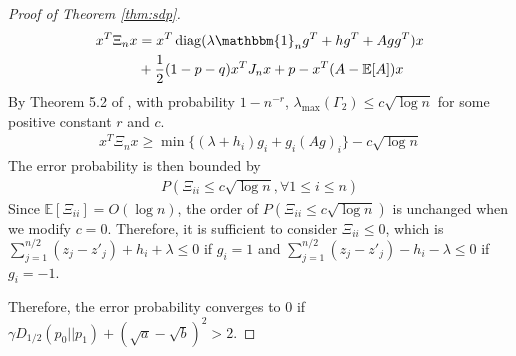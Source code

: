 \documentclass[conference]{IEEEtran}
\DeclareMathOperator{\diag}{diag}
\begin{document}
\begin{proof}[Proof of Theorem \ref{thm:sdp}]
\begin{align*}
		x^T \Xi_n x &= x^T \diag( \lambda \mathbbm{1}_ng^T+hg^T + Agg^T) x  \\
		&+ \frac{1}{2}(1-p-q)x^TJ_n x
		 + p -x^T(A-\mathbb{E}[A])x
		\end{align*}
		By Theorem 5.2 of \cite{lei2015consistency},
		with probability $1-n^{-r}$, $\lambda_{\max}(\Gamma_2) \leq c\sqrt{\log n}$ for some positive constant $r$ and $c$.
		\begin{align*}
		x^T \Xi_n x \geq \min\{(\lambda + h_i) g_i + g_i (Ag)_i \} - c \sqrt{\log n}
		\end{align*}
		The error probability is then bounded by
		\begin{align*}
		P(\Xi_{ii} \leq c\sqrt{\log n}, \forall 1\leq i \leq n)
		\end{align*}
		Since $\mathbb{E}[\Xi_{ii}]=O(\log n)$, the order of $P(\Xi_{ii} \leq c\sqrt{\log n})$ is unchanged when we modify $c=0$. Therefore, it is sufficient to consider $\Xi_{ii} \leq 0 $, which is
		$\sum_{j=1}^{n/2} (z_j - z'_j) + h_i + \lambda \leq 0$ if $g_i=1$ and
		$\sum_{j=1}^{n/2} (z_j - z'_j) - h_i - \lambda \leq 0$ if $g_i = -1$.
	
		Therefore, the error probability converges to 0
		if $\gamma D_{1/2}(p_0||p_1) + (\sqrt{a} - \sqrt{b})^2 > 2$.
		
	\end{proof}
	
	
	
\end{document}
